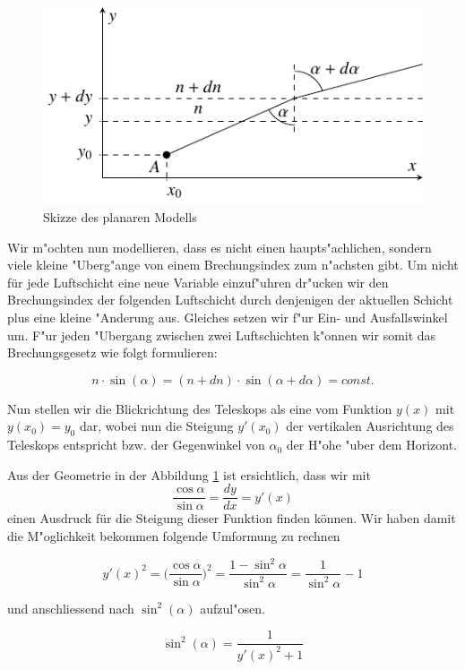 \begin{refsection}
\begin{figure}
\centering
\includegraphics{licht/standalone/fig_planar_skizze.pdf}
\caption{Skizze des planaren Modells}
\label{fig:13_1}
\end{figure}

Wir m"ochten nun modellieren, dass es nicht einen haupts"achlichen, sondern viele kleine "Uberg"ange von einem Brechungsindex zum n"achsten gibt. 
Um nicht für jede Luftschicht eine neue Variable einzuf"uhren dr"ucken wir den Brechungsindex der folgenden Luftschicht durch denjenigen der aktuellen Schicht plus eine kleine "Anderung aus. 
Gleiches setzen wir f"ur Ein- und Ausfallswinkel um. 
F"ur jeden "Ubergang zwischen zwei Luftschichten k"onnen wir somit das Brechungsgesetz wie folgt formulieren:

\begin{equation} \label{eq:13_1}
  n \cdot \sin(\alpha) = (n + dn) \cdot \sin(\alpha + d\alpha) = const.
\end{equation}

Nun stellen wir die Blickrichtung des Teleskops als eine vom Funktion $y(x)$ mit $y(x_0) = y_0$ dar, wobei nun die Steigung $y'(x_0)$ der vertikalen Ausrichtung des Teleskops entspricht bzw. der Gegenwinkel von  $\alpha_0$ der H"ohe "uber dem Horizont.

Aus der Geometrie in der Abbildung \ref{fig:13_1} ist ersichtlich, dass wir mit 
$$\frac{\cos \alpha}{\sin \alpha} = \frac{dy}{dx} = y'(x)$$
einen Ausdruck für die Steigung dieser Funktion finden können. 
Wir haben damit die M"oglichkeit bekommen folgende Umformung zu rechnen

$$ y'(x)^2 = \biggl(\frac{\cos \alpha}{\sin \alpha}\biggr)^2 = \frac{1 - \sin^2 \alpha}{\sin^2 \alpha} = \frac{1}{\sin^2 \alpha} - 1$$

und anschliessend nach $\sin^2(\alpha)$ aufzul"osen.

\begin{equation} \label{eq:13_2}
\sin^2 (\alpha) = \frac{1}{y'(x)^2 + 1}
\end{equation}


\end{refsection}
